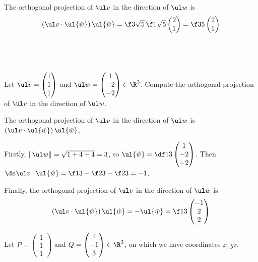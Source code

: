 \documentclass[a4paper]{article}
\begin{document}
The orthogonal projection of $\ul v$ in the direction of $\ul w$ is \[
(\ul v \cdot \ul{\hat w})\, \ul{\hat w}
= \f3{\sqrt5}\, \f1{\sqrt5} \begin{pmatrix}2 \\ 1\end{pmatrix}
= \f35 \begin{pmatrix}2 \\ 1\end{pmatrix}
\]

\subsection{~} %

\begin{questionbody}
Let $\ul v = \begin{pmatrix}1 \\ 1 \\ 1\end{pmatrix}$ and $\ul w = \begin{pmatrix}1 \\ -2 \\ -2\end{pmatrix} \in \R^3$. Compute the orthogonal projection of $\ul v$ in the direction of $\ul w$.
\end{questionbody}

The orthogonal projection of $\ul v$ in the direction of $\ul w$ is $(\ul v \cdot \ul{\hat w})\, \ul{\hat w}$.

Firstly, $\|\ul w\| = \sqrt{1+4+4} = 3$, so $\ul{\hat w} = \df13 \begin{pmatrix}1 \\ -2 \\ -2\end{pmatrix}$. Then $\ds \ul v \cdot \ul{\hat w} = \f13 - \f23 - \f23 = -1$.

Finally, the orthogonal projection of $\ul v$ in the direction of $\ul w$ is \[
(\ul v \cdot \ul{\hat w})\, \ul{\hat w}
= - \ul{\hat w}
= \f13 \begin{pmatrix}-1 \\ 2 \\ 2\end{pmatrix}
\]


\begin{questionbody}
Let $P = \begin{pmatrix}1 \\ 1 \\ 1\end{pmatrix}$ and $Q = \begin{pmatrix}1 \\ -1 \\ 3\end{pmatrix} \in \R^3$, on which we have coordinates $x, y z$.
\end{questionbody}
\end{document}
